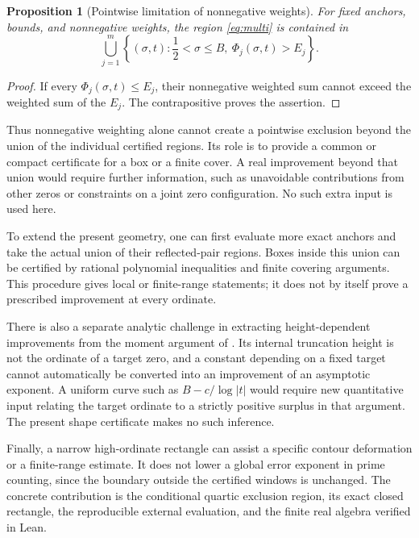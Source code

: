 \documentclass[11pt,a4paper]{article}
\newtheorem{proposition}[theorem]{Proposition}
\theoremstyle{definition}
\begin{document}
\begin{proposition}[Pointwise limitation of nonnegative weights]
\label{prop:limitation}
For fixed anchors, bounds, and nonnegative weights, the region
\eqref{eq:multi} is contained in
\[
 \bigcup_{j=1}^m
 \left\{(\sigma,t):\frac12<\sigma\le B,
                         \ \Phi_j(\sigma,t)>E_j\right\}.
\]
\end{proposition}

\begin{proof}
If every $\Phi_j(\sigma,t)\le E_j$, their nonnegative
weighted sum cannot exceed the weighted sum of the $E_j$.
The contrapositive proves the assertion.
\end{proof}

Thus nonnegative weighting alone cannot create a pointwise
exclusion beyond the union of the individual certified
regions. Its role is to provide a common or compact
certificate for a box or a finite cover. A real improvement
beyond that union would require further information, such as
unavoidable contributions from other zeros or constraints on
a joint zero configuration. No such extra input is used here.

To extend the present geometry, one can first evaluate more
exact anchors and take the actual union of their reflected-pair
regions. Boxes inside this union can be certified by rational
polynomial inequalities and finite covering arguments. This
procedure gives local or finite-range statements; it does not
by itself prove a prescribed improvement at every ordinate.

There is also a separate analytic challenge in extracting
height-dependent improvements from the moment argument of
\cite{Cubic}. Its internal truncation height is not the
ordinate of a target zero, and a constant depending on a fixed
target cannot automatically be converted into an improvement
of an asymptotic exponent. A uniform curve such as
$B-c/\log|t|$ would require new quantitative input relating
the target ordinate to a strictly positive surplus in that
argument. The present shape certificate makes no such
inference.

Finally, a narrow high-ordinate rectangle can assist a
specific contour deformation or a finite-range estimate.
It does not lower a global error exponent in prime counting,
since the boundary outside the certified windows is unchanged.
The concrete contribution is the conditional quartic
exclusion region, its exact closed rectangle, the reproducible
external evaluation, and the finite real algebra verified in
Lean.
\end{document}
